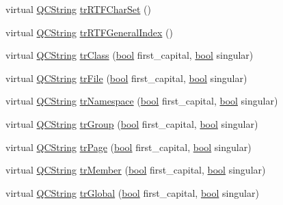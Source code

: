 \begin{DoxyCompactItemize}
\item 
virtual \hyperlink{class_q_c_string}{Q\+C\+String} \hyperlink{class_translator_dutch_aefa5abdf5065d86bc2a02c95c301118a}{tr\+R\+T\+F\+Char\+Set} ()
\item 
virtual \hyperlink{class_q_c_string}{Q\+C\+String} \hyperlink{class_translator_dutch_ad8f9b957281e4b46e08c110c200ebaf2}{tr\+R\+T\+F\+General\+Index} ()
\item 
virtual \hyperlink{class_q_c_string}{Q\+C\+String} \hyperlink{class_translator_dutch_ae5c72fc8e607d48f0f1084108a662f34}{tr\+Class} (\hyperlink{qglobal_8h_a1062901a7428fdd9c7f180f5e01ea056}{bool} first\+\_\+capital, \hyperlink{qglobal_8h_a1062901a7428fdd9c7f180f5e01ea056}{bool} singular)
\item 
virtual \hyperlink{class_q_c_string}{Q\+C\+String} \hyperlink{class_translator_dutch_a13ca5c92ff75a2c44962e926d3d55aea}{tr\+File} (\hyperlink{qglobal_8h_a1062901a7428fdd9c7f180f5e01ea056}{bool} first\+\_\+capital, \hyperlink{qglobal_8h_a1062901a7428fdd9c7f180f5e01ea056}{bool} singular)
\item 
virtual \hyperlink{class_q_c_string}{Q\+C\+String} \hyperlink{class_translator_dutch_ace82533e75f03a0747bb831f4ee0d959}{tr\+Namespace} (\hyperlink{qglobal_8h_a1062901a7428fdd9c7f180f5e01ea056}{bool} first\+\_\+capital, \hyperlink{qglobal_8h_a1062901a7428fdd9c7f180f5e01ea056}{bool} singular)
\item 
virtual \hyperlink{class_q_c_string}{Q\+C\+String} \hyperlink{class_translator_dutch_a2ca257473515f26db8261213517f76ae}{tr\+Group} (\hyperlink{qglobal_8h_a1062901a7428fdd9c7f180f5e01ea056}{bool} first\+\_\+capital, \hyperlink{qglobal_8h_a1062901a7428fdd9c7f180f5e01ea056}{bool} singular)
\item 
virtual \hyperlink{class_q_c_string}{Q\+C\+String} \hyperlink{class_translator_dutch_a5cbf8865535ebece78ff6a41c904e327}{tr\+Page} (\hyperlink{qglobal_8h_a1062901a7428fdd9c7f180f5e01ea056}{bool} first\+\_\+capital, \hyperlink{qglobal_8h_a1062901a7428fdd9c7f180f5e01ea056}{bool} singular)
\item 
virtual \hyperlink{class_q_c_string}{Q\+C\+String} \hyperlink{class_translator_dutch_a2a80b7a963cbeea8ffdc12831224f164}{tr\+Member} (\hyperlink{qglobal_8h_a1062901a7428fdd9c7f180f5e01ea056}{bool} first\+\_\+capital, \hyperlink{qglobal_8h_a1062901a7428fdd9c7f180f5e01ea056}{bool} singular)
\item 
virtual \hyperlink{class_q_c_string}{Q\+C\+String} \hyperlink{class_translator_dutch_a84677edea3afc4551b0ac3a00b6283e6}{tr\+Global} (\hyperlink{qglobal_8h_a1062901a7428fdd9c7f180f5e01ea056}{bool} first\+\_\+capital, \hyperlink{qglobal_8h_a1062901a7428fdd9c7f180f5e01ea056}{bool} singular)

\end{DoxyCompactItemize}
